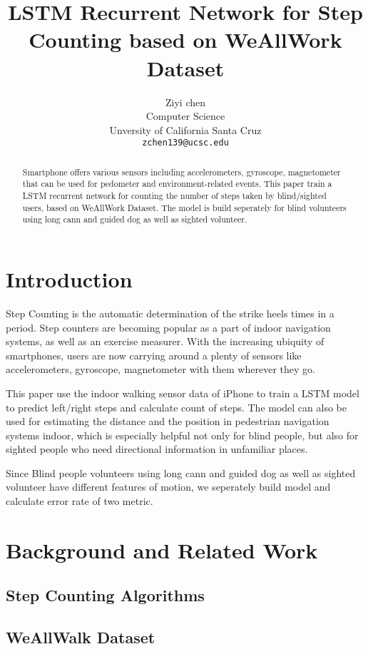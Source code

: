 \documentclass[11pt]{article}
\title{LSTM Recurrent Network for Step Counting based on WeAllWork Dataset}
\author{Ziyi chen \\
  Computer Science  \\
  Unversity of California Santa Cruz\\
  {\tt zchen139@ucsc.edu}}
\date{}
\begin{document}
\maketitle
\begin{abstract}

Smartphone offers various sensors including accelerometers, gyroscope, magnetometer that can be used for pedometer and environment-related events. This paper train a LSTM recurrent network for counting the number of steps taken by blind/sighted users, based on WeAllWork Dataset. The model is build seperately for blind volunteers using long cann and guided dog as well as sighted volunteer.

\end{abstract}

\section{Introduction}

Step Counting is the automatic determination of the strike heels times in a period. Step counters are becoming popular as a part of indoor navigation systems, as well as an exercise measurer. With the increasing ubiquity of smartphones, users are now carrying around a plenty of sensors like accelerometers, gyroscope, magnetometer with them wherever they go. 

This paper use the indoor walking sensor data of iPhone to train a LSTM model to predict left/right steps and calculate count of steps. The model can also be used for estimating the distance and the position in pedestrian navigation systems indoor, which is especially helpful not only for blind people, but also for sighted people who need directional information in unfamiliar places.

Since Blind people volunteers using long cann and guided dog as well as sighted volunteer have different features of motion, we seperately build model and calculate error rate of two metric.



\section{Background and Related Work}
\subsection{Step Counting Algorithms}
\subsection{WeAllWalk Dataset}
\end{document}
